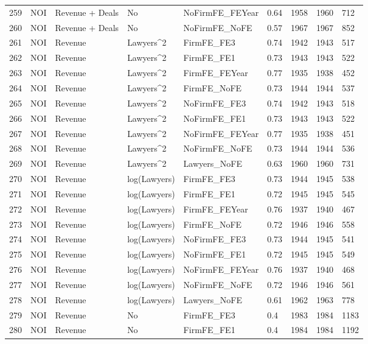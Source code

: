 \documentclass{article}
\begin{document}
\begin{table}[H]
\begin{tabular}{rllllllll}
  259 & NOI & Revenue + Deals & No & NoFirmFE\_FEYear & 0.64 & 1958 & 1960 & 712 \\ 
  260 & NOI & Revenue + Deals & No & NoFirmFE\_NoFE & 0.57 & 1967 & 1967 & 852 \\ 
  261 & NOI & Revenue & Lawyers^2 & FirmFE\_FE3 & 0.74 & 1942 & 1943 & 517 \\ 
  262 & NOI & Revenue & Lawyers^2 & FirmFE\_FE1 & 0.73 & 1943 & 1943 & 522 \\ 
  263 & NOI & Revenue & Lawyers^2 & FirmFE\_FEYear & 0.77 & 1935 & 1938 & 452 \\ 
  264 & NOI & Revenue & Lawyers^2 & FirmFE\_NoFE & 0.73 & 1944 & 1944 & 537 \\ 
  265 & NOI & Revenue & Lawyers^2 & NoFirmFE\_FE3 & 0.74 & 1942 & 1943 & 518 \\ 
  266 & NOI & Revenue & Lawyers^2 & NoFirmFE\_FE1 & 0.73 & 1943 & 1943 & 522 \\ 
  267 & NOI & Revenue & Lawyers^2 & NoFirmFE\_FEYear & 0.77 & 1935 & 1938 & 451 \\ 
  268 & NOI & Revenue & Lawyers^2 & NoFirmFE\_NoFE & 0.73 & 1944 & 1944 & 536 \\ 
  269 & NOI & Revenue & Lawyers^2 & Lawyers\_NoFE & 0.63 & 1960 & 1960 & 731 \\ 
  270 & NOI & Revenue & log(Lawyers) & FirmFE\_FE3 & 0.73 & 1944 & 1945 & 538 \\ 
  271 & NOI & Revenue & log(Lawyers) & FirmFE\_FE1 & 0.72 & 1945 & 1945 & 545 \\ 
  272 & NOI & Revenue & log(Lawyers) & FirmFE\_FEYear & 0.76 & 1937 & 1940 & 467 \\ 
  273 & NOI & Revenue & log(Lawyers) & FirmFE\_NoFE & 0.72 & 1946 & 1946 & 558 \\ 
  274 & NOI & Revenue & log(Lawyers) & NoFirmFE\_FE3 & 0.73 & 1944 & 1945 & 541 \\ 
  275 & NOI & Revenue & log(Lawyers) & NoFirmFE\_FE1 & 0.72 & 1945 & 1945 & 549 \\ 
  276 & NOI & Revenue & log(Lawyers) & NoFirmFE\_FEYear & 0.76 & 1937 & 1940 & 468 \\ 
  277 & NOI & Revenue & log(Lawyers) & NoFirmFE\_NoFE & 0.72 & 1946 & 1946 & 561 \\ 
  278 & NOI & Revenue & log(Lawyers) & Lawyers\_NoFE & 0.61 & 1962 & 1963 & 778 \\ 
  279 & NOI & Revenue & No & FirmFE\_FE3 & 0.4 & 1983 & 1984 & 1183 \\ 
  280 & NOI & Revenue & No & FirmFE\_FE1 & 0.4 & 1984 & 1984 & 1192 \\ 
   \hline
\end{tabular}
\end{table}
\end{document}
